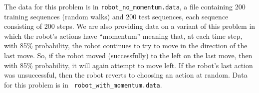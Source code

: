 \documentclass[submit]{harvardml}
\begin{document}
The data for this problem is in {\tt robot\_no\_momentum.data}, a file
containing 200 training sequences (random walks) and 200 test
sequences, each sequence consisting of 200 steps. We are also
providing data on a variant of this problem in which the robot's
actions have ``momentum'' meaning that, at each time step, with 85\%
probability, the robot continues to try to move in the direction of the last
move.  So, if the robot moved (successfully) to the left on the last
move, then with 85\% probability, it will again attempt to move left.
If the robot's last action was unsuccessful, then the robot reverts to
choosing an action at random.  Data for this problem is in {\tt
  robot\_with\_momentum.data}.


\pagebreak



\end{document}
